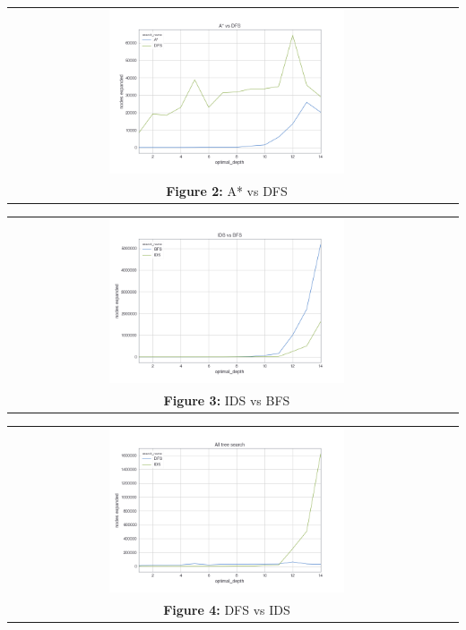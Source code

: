 \documentclass[10pt]{article}
\begin{document}
  \begin{center}
    \begin{tabular}{cc}
    \includegraphics[width=0.55\textwidth]{images/a_star_vs_dfs.png} \\
    \textbf{Figure 2: } A* vs DFS \\
      \end{tabular}
    \end{center}
  
  \begin{center}
    \begin{tabular}{cc}
    \includegraphics[width=0.55\textwidth]{images/ids_bfs.png} \\
    \textbf{Figure 3: } IDS vs BFS \\

      \end{tabular}
    \end{center}

  \begin{center}
    \begin{tabular}{cc}
    \includegraphics[width=0.55\textwidth]{images/dfs_ids.png} \\
    \textbf{Figure 4: } DFS vs IDS \\

      \end{tabular}
    \end{center}
\end{document}
